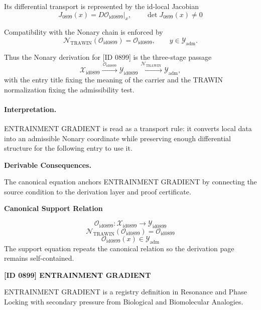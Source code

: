 Its differential transport is represented by the id-local Jacobian\[
J_{0899}(x)=D\mathcal{O}_{\mathrm{id0899}}\big|_x,\qquad \det J_{0899}(x)\neq 0
\]

Compatibility with the Nonary chain is enforced by\[
\mathcal{N}_{\mathrm{TRAWIN}}(\mathcal{O}_{\mathrm{id0899}})=\mathcal{O}_{\mathrm{id0899}},\qquad y\in\mathcal{Y}_{\mathrm{adm}}.
\]

Thus the Nonary derivation for [ID 0899] is the three-stage passage
\[
\mathcal{X}_{\mathrm{id0899}}\xrightarrow{\,\mathcal{O}_{\mathrm{id0899}}\,} \mathcal{Y}_{\mathrm{id0899}}\xrightarrow{\,\mathcal{N}_{\mathrm{TRAWIN}}\,} \mathcal{Y}_{\mathrm{adm}},
\]
with the entry title fixing the meaning of the carrier and the TRAWIN normalization fixing the admissibility test.

\paragraph{Interpretation.} ENTRAINMENT GRADIENT is read as a transport rule: it converts local data into an admissible Nonary coordinate while preserving enough differential structure for the following entry to use it.

\par\vspace{0.35em}
\noindent\textbf{Derivable Consequences.}\quad
\begingroup
\footnotesize
\raggedright
The canonical equation anchors ENTRAINMENT GRADIENT by connecting the source condition to the derivation layer and proof certificate.
\par\endgroup

\noindent\textbf{Canonical Support Relation}\par
\[
\mathcal{O}_{\mathrm{id0899}}:\mathcal{X}_{\mathrm{id0899}}\longrightarrow\mathcal{Y}_{\mathrm{id0899}}
\]
\[
\mathcal{N}_{\mathrm{TRAWIN}}(\mathcal{O}_{\mathrm{id0899}})=\mathcal{O}_{\mathrm{id0899}}
\]
\[
\mathcal{O}_{\mathrm{id0899}}(x)\in\mathcal{Y}_{\mathrm{adm}}
\]
\noindent The support equation repeats the canonical relation so the derivation page remains self-contained.\par

\clearpage
\noindent\textbf{[ID 0899] ENTRAINMENT GRADIENT}\par
\vspace{0.35em}
\begingroup\small
{}
ENTRAINMENT GRADIENT is a registry definition in Resonance and Phase Locking with secondary pressure from Biological and Biomolecular Analogies.

